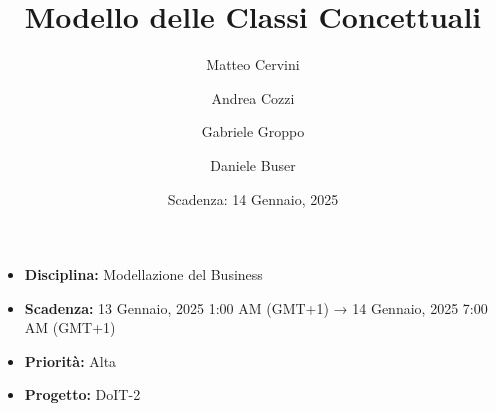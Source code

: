 \title{Modello delle Classi Concettuali}
\author{Matteo Cervini \and Andrea Cozzi \and Gabriele Groppo \and Daniele Buser}
\date{Scadenza: 14 Gennaio, 2025}

\maketitle

\begin{itemize}
    \item \textbf{Disciplina:} Modellazione del Business
    \item \textbf{Scadenza:} 13 Gennaio, 2025 1:00 AM (GMT+1) → 14 Gennaio, 2025 7:00 AM (GMT+1)
    \item \textbf{Priorità:} Alta
    \item \textbf{Progetto:} DoIT-2
\end{itemize}